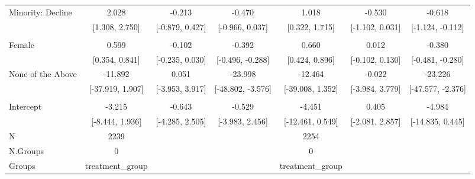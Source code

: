 \documentclass[
  10,
  letterpaper,
  DIV=11,
  numbers=noendperiod]{scrartcl}
\begin{document}
\begin{table}
\begin{tabular}[t]{lcccccc}
\hspace{1em}Minority: Decline & 2.028 & -0.213 & -0.470 & 1.018 & -0.530 & -0.618\\
\hspace{1em} & {}[1.308, 2.750] & {}[-0.879, 0.427] & {}[-0.966, 0.037] & {}[0.322, 1.715] & {}[-1.102, 0.031] & {}[-1.124, -0.112]\\
\addlinespace[0.3em]
\multicolumn{7}{l}{\cellcolor[HTML]{3498DB}{\textbf{Gender}}}\\
\hspace{1em}Female & 0.599 & -0.102 & -0.392 & 0.660 & 0.012 & -0.380\\
\hspace{1em} & {}[0.354, 0.841] & {}[-0.235, 0.030] & {}[-0.496, -0.288] & {}[0.424, 0.896] & {}[-0.102, 0.130] & {}[-0.481, -0.280]\\
\hspace{1em}None of the Above & -11.892 & 0.051 & -23.998 & -12.464 & -0.022 & -23.226\\
\hspace{1em} & {}[-37.919, 1.907] & {}[-3.953, 3.917] & {}[-48.802, -3.576] & {}[-39.008, 1.352] & {}[-3.984, 3.779] & {}[-47.577, -2.376]\\
\addlinespace[0.3em]
\multicolumn{7}{l}{\cellcolor[HTML]{3498DB}{\textbf{Intercept}}}\\
\hspace{1em}Intercept & -3.215 & -0.643 & -0.529 & -4.451 & 0.405 & -4.984\\
\hspace{1em} & {}[-8.444, 1.936] & {}[-4.285, 2.505] & {}[-3.983, 2.456] & {}[-12.461, 0.549] & {}[-2.081, 2.857] & {}[-14.835, 0.445]\\
\midrule
N & 2239 &  &  & 2254 &  & \\
N.Groups & 0 &  &  & 0 &  & \\
Groups & treatment\_group &  &  & treatment\_group &  & \\
\bottomrule
\end{tabular}
\end{table}
\end{document}
